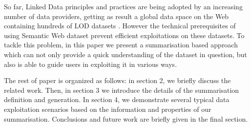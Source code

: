 So far, Linked Data principles and practices are being adopted by an increasing number of data providers, getting as result a global data space on the Web containing hundreds of LOD datasets \cite{Heath_Bizer_2011}. However the technical prerequisites of using Semantic Web dataset prevent efficient exploitations on these datasets. To tackle this problem, in this paper we present a summarisation based approach which can not only provide a quick understanding of the dataset in question, but also is able to guide users in exploiting it in various ways.

The rest of paper is organized as follows: in section 2, we briefly discuss the related work. Then, in section 3 we  introduce the details of the summarisation definition and generation. In section 4, we demonstrate several typical data exploitation scenarios based on the information and properties of our summarisation. Conclusions and future work are briefly given in the final section.
